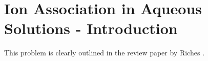 \mainmatter

\pagestyle{fancy}
\fancyhf{}
\renewcommand{\headrulewidth}{0pt}
\fancyfoot[CE,CO]{\thepage}

\titlespacing*{\chapter}{0pt}{0pt}{1em}

\begingroup
\chapter{Ion Association in Aqueous Solutions - Introduction}
\endgroup

\begin{spacing}{2.0}

    This problem is clearly outlined in the review paper by Riches \cite{P-ChemRev-2005-v105-Richens}. 

\end{spacing}
